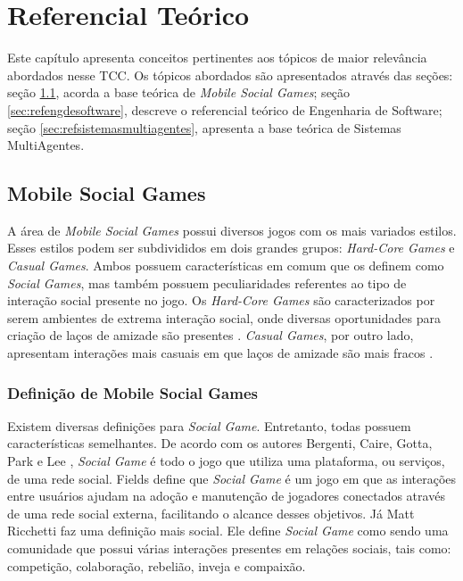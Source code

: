 \chapter[Referencial Teórico]{Referencial Teórico}

Este capítulo apresenta conceitos pertinentes aos tópicos de maior relevância
abordados nesse TCC. Os tópicos abordados são apresentados através das seções:
seção \ref{sec:refmobilesocialgames}, acorda a base teórica
de \textit{Mobile Social Games}; seção \ref{sec:refengdesoftware},
descreve o referencial teórico de Engenharia de Software; seção
\ref{sec:refsistemasmultiagentes}, apresenta a base teórica de
Sistemas MultiAgentes.

\section{Mobile Social Games}
\label{sec:refmobilesocialgames}

A área de \textit{Mobile Social Games} possui diversos jogos com os mais
variados estilos. Esses estilos podem ser subdivididos em dois grandes grupos:
\textit{Hard-Core Games} e \textit{Casual Games}. Ambos possuem
características em comum que os definem como \textit{Social Games}, mas também
possuem peculiaridades referentes ao tipo de interação social presente no
jogo. Os \textit{Hard-Core Games} são caracterizados por serem ambientes de
extrema interação social, onde diversas oportunidades para criação de laços de
amizade são presentes \cite{cole2007}. \textit{Casual Games}, por outro lado,
apresentam interações mais casuais em que laços de amizade são mais fracos
\cite{ricchetti2015}.

    \subsection{Definição de Mobile Social Games}
Existem diversas definições para \textit{Social Game}. Entretanto, todas
possuem características semelhantes. De acordo com os autores Bergenti, Caire,
Gotta, Park e Lee \cite{bergenti2013} \cite{park2012}, \textit{Social Game} é
todo o jogo que utiliza uma plataforma, ou serviços, de uma rede social.
Fields \cite{fields2014} define que \textit{Social Game} é um jogo em que as
interações entre usuários ajudam na adoção e manutenção de jogadores
conectados através de uma rede social externa, facilitando o alcance desses
objetivos. Já Matt Ricchetti \cite{ricchetti2015} faz uma definição mais
social. Ele define \textit{Social Game} como sendo uma comunidade que possui
várias interações presentes em relações sociais, tais como: competição,
colaboração, rebelião, inveja e compaixão.

